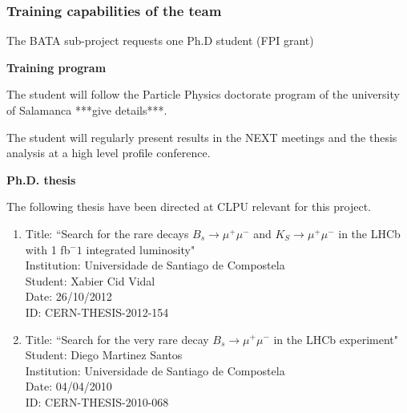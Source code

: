%
%

\subsubsection*{Training capabilities of the team}

The BATA sub-project requests one Ph.D student (FPI grant)

{\bf Training program}

The student will follow the Particle Physics doctorate program of the university of Salamanca ***give details***.

The student will regularly present results in the NEXT meetings and the thesis analysis at  a high level profile conference.

{\bf Ph.D. thesis}

The following thesis have been directed at CLPU relevant for this project. \begin{enumerate}

\item Title: ``Search for the rare decays $B_s \to \mu^+\mu^-$
and $K_S \to \mu^+\mu^-$ in the LHCb with 1 fb$^-1$ integrated luminosity" \\
Institution: Universidade de Santiago de Compostela \\
Student: Xabier Cid Vidal \\
Date: 26/10/2012 \\
ID: CERN-THESIS-2012-154  

\item Title: ``Search for the very rare decay $B_s \to \mu^+\mu^-$ in the LHCb experiment" \\
Student: Diego Martinez Santos \\
Institution: Universidade de Santiago de Compostela \\
Date: 04/04/2010 \\
ID: CERN-THESIS-2010-068 

\end{enumerate}

